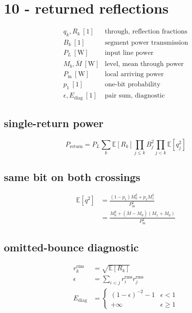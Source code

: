 \clearpage
\section*{10 - returned reflections}

\[
\begin{array}{ll}q_k,R_k\ [1]&\text{through, reflection fractions}\\[0.6em]B_k\ [1]&\text{segment power transmission}\\[0.6em]P_L\ [\mathrm W]&\text{input line power}\\[0.6em]M_b,\overline M\ [\mathrm W]&\text{level, mean through power}\\[0.6em]P_{\mathrm{in}}\ [\mathrm W]&\text{local arriving power}\\[0.6em]p_1\ [1]&\text{one-bit probability}\\[0.6em]\epsilon,E_{\mathrm{diag}}\ [1]&\text{pair sum, diagnostic}\end{array}
\]

\subsection*{single-return power}
\[
\displaystyle P_{\mathrm{return}}=P_L\sum_k\mathbb E[R_k]\prod_{j\le k}B_j^2\prod_{j<k}\mathbb E[q_j^2]
\]

\subsection*{same bit on both crossings}
\[
\displaystyle \begin{aligned}\mathbb E[q^2]&=\frac{(1-p_1)M_0^2+p_1M_1^2}{P_{\mathrm{in}}^2}\\&=\frac{M_0^2+(\overline M-M_0)(M_1+M_0)}{P_{\mathrm{in}}^2}\end{aligned}
\]

\subsection*{omitted-bounce diagnostic}
\[
\displaystyle \begin{aligned}r_k^{\mathrm{rms}}&=\sqrt{\mathbb E[R_k]}\\\epsilon&=\sum_{i<j}r_i^{\mathrm{rms}}r_j^{\mathrm{rms}}\\E_{\mathrm{diag}}&=\begin{cases}(1-\epsilon)^{-2}-1&\epsilon<1\\+\infty&\epsilon\ge1\end{cases}\end{aligned}
\]

